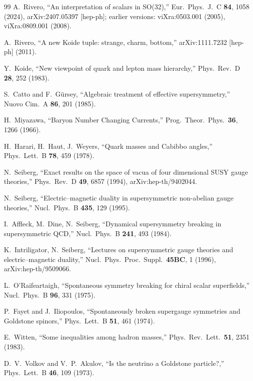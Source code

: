 \documentclass[12pt,a4paper]{article}
\begin{document}
\begin{thebibliography}{99}
A.~Rivero, ``An interpretation of scalars in SO(32),''
Eur.\ Phys.\ J.\ C \textbf{84}, 1058 (2024),
arXiv:2407.05397 [hep-ph]; earlier versions: viXra:0503.001 (2005),
viXra:0809.001 (2008).

A.~Rivero, ``A new Koide tuple: strange, charm, bottom,'' 
arXiv:1111.7232 [hep-ph] (2011).

Y.~Koide, ``New viewpoint of quark and lepton mass hierarchy,'' 
Phys.\ Rev.\ D \textbf{28}, 252 (1983).

S.~Catto and F.~G\"ursey, ``Algebraic treatment of effective 
supersymmetry,'' Nuovo Cim.\ A \textbf{86}, 201 (1985).

H.~Miyazawa, ``Baryon Number Changing Currents,'' 
Prog.\ Theor.\ Phys.\ \textbf{36}, 1266 (1966).

H.~Harari, H.~Haut, J.~Weyers, ``Quark masses and Cabibbo 
angles,'' Phys.\ Lett.\ B \textbf{78}, 459 (1978).

N.~Seiberg, ``Exact results on the space of vacua of four
dimensional SUSY gauge theories,''
Phys.\ Rev.\ D \textbf{49}, 6857 (1994),
arXiv:hep-th/9402044.

N.~Seiberg, ``Electric--magnetic duality in supersymmetric
non-abelian gauge theories,'' Nucl.\ Phys.\ B \textbf{435}, 129
(1995).

I.~Affleck, M.~Dine, N.~Seiberg, ``Dynamical supersymmetry breaking in
supersymmetric QCD,'' Nucl.\ Phys.\ B \textbf{241}, 493 (1984).

K.~Intriligator, N.~Seiberg, ``Lectures on supersymmetric gauge
theories and electric--magnetic duality,'' Nucl.\ Phys.\ Proc.\
Suppl.\ \textbf{45BC}, 1 (1996), arXiv:hep-th/9509066.

L.~O'Raifeartaigh, ``Spontaneous symmetry breaking for chiral 
scalar superfields,'' Nucl.\ Phys.\ B \textbf{96}, 331 (1975).

P.~Fayet and J.~Iliopoulos, ``Spontaneously broken supergauge 
symmetries and Goldstone spinors,'' Phys.\ Lett.\ B \textbf{51}, 
461 (1974).

E.~Witten, ``Some inequalities among hadron masses,'' 
Phys.\ Rev.\ Lett.\ \textbf{51}, 2351 (1983).

D.~V.~Volkov and V.~P.~Akulov, ``Is the neutrino a Goldstone 
particle?,'' Phys.\ Lett.\ B \textbf{46}, 109 (1973).


\end{thebibliography}
\end{document}
